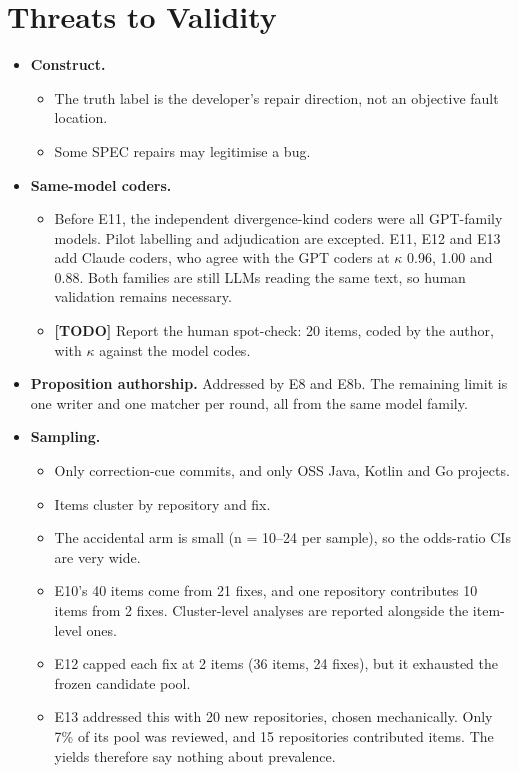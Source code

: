 \documentclass[acmsmall,screen,review,anonymous]{acmart}
\begin{document}
\section{Threats to Validity}
\begin{itemize}
\item \textbf{Construct.}
\begin{itemize}
\item The truth label is the developer's repair direction, not an objective fault location.
\item Some SPEC repairs may legitimise a bug.
\end{itemize}
\item \textbf{Same-model coders.}
\begin{itemize}
\item Before E11, the independent divergence-kind coders were all GPT-family models. Pilot labelling and adjudication are excepted. E11, E12 and E13 add Claude coders, who agree with the GPT coders at $\kappa$ 0.96, 1.00 and 0.88. Both families are still LLMs reading the same text, so human validation remains necessary.
\item \textbf{[TODO]} Report the human spot-check: 20 items, coded by the author, with $\kappa$ against the model codes.
\end{itemize}
\item \textbf{Proposition authorship.} Addressed by E8 and E8b. The remaining limit is one writer and one matcher per round, all from the same model family.
\item \textbf{Sampling.}
\begin{itemize}
\item Only correction-cue commits, and only OSS Java, Kotlin and Go projects.
\item Items cluster by repository and fix.
\item The accidental arm is small (n = 10--24 per sample), so the odds-ratio CIs are very wide.
\item E10's 40 items come from 21 fixes, and one repository contributes 10 items from 2 fixes. Cluster-level analyses are reported alongside the item-level ones.
\item E12 capped each fix at 2 items (36 items, 24 fixes), but it exhausted the frozen candidate pool.
\item E13 addressed this with 20 new repositories, chosen mechanically. Only 7\% of its pool was reviewed, and 15 repositories contributed items. The yields therefore say nothing about prevalence.
\end{itemize}

\end{itemize}
\end{document}

